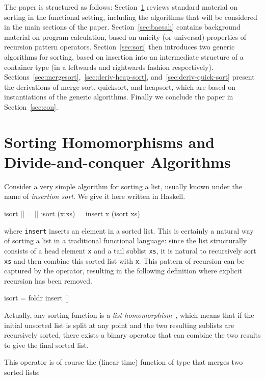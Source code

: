 \documentclass[a4paper,11pt]{llncs}
\begin{document}
The paper is structured as follows: Section~\ref{sec:sorting} reviews
standard material on sorting in the functional setting, including the
algorithms that will be considered in the main sections of the
paper. Section~\ref{sec:bacsah} contains background material on
program calculation, based on unicity (or universal) properties of
recursion pattern operators. Section~\ref{sec:sori} then introduces
two generic algorithms for sorting, based on insertion into an
intermediate structure of a container type (in a leftwards and
rightwards fashion
respectively). Sections~\ref{sec:mergesort},~\ref{sec:deriv-heap-sort},
and~\ref{sec:deriv-quick-sort} present the derivations of merge sort,
quicksort, and heapsort, which are based on instantiations of the
generic algorithms. Finally we conclude the paper in
Section~\ref{sec:con}.




\section{Sorting Homomorphisms and Divide-and-conquer Algorithms }        

\label{sec:sorting}

Consider a very simple algorithm for sorting a list, usually known
under the name of \emph{insertion sort}. We give it here written in
Haskell.
\begin{code}
isort []     = []
isort (x:xs) = insert x (isort xs) 
\end{code}
where \verb+insert+ inserts an element in a sorted list. This is
certainly a natural way of sorting a list in a traditional functional
language: since the list structurally consists of a head element
\texttt{x} and a tail sublist \texttt{xs}, it is natural to
recursively sort \texttt{xs} and then combine this sorted list with
\texttt{x}. This pattern of recursion can be captured by the
 operator, resulting in the following definition where
explicit recursion has been removed.
\begin{code}
isort = foldr insert []
\end{code}
Actually, any sorting function is a \emph{list
  homomorphism}~\cite{BirdR:inttl,GibbonsJ:thiht}, which means that if
the initial unsorted list is split at any point and the two resulting
sublists are recursively sorted, there exists a binary operator 
that can combine the two results to give the final sorted list.

This  operator is of course the (linear time) function of type
 that merges two sorted lists:
\end{document}
